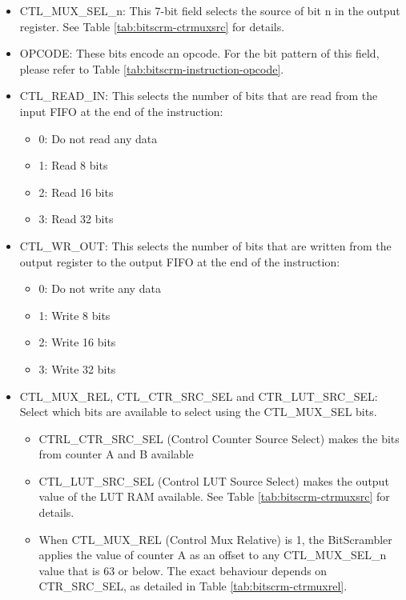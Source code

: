 \documentclass[main\_\_EN.tex]{subfiles}
\begin{document}
\begin{itemize}
\item CTL\_MUX\_SEL\_n: This 7-bit field selects the source of bit n in the output register. See Table \ref{tab:bitscrm-ctrmuxsrc} for details.
\item OPCODE: These bits encode an opcode. For the bit pattern of this field, please refer to Table \ref{tab:bitscrm-instruction-opcode}.
\item CTL\_READ\_IN: This selects the number of bits that are read from the input FIFO at the end of the instruction:

\begin{itemize}
\item 0: Do not read any data
\item 1: Read 8 bits
\item 2: Read 16 bits
\item 3: Read 32 bits
\end{itemize}

\item CTL\_WR\_OUT: This selects the number of bits that are written from the output register to the output FIFO at the end of the instruction:
\begin{itemize}
\item 0: Do not write any data
\item 1: Write 8 bits
\item 2: Write 16 bits
\item 3: Write 32 bits
\end{itemize}


\item CTL\_MUX\_REL, CTL\_CTR\_SRC\_SEL and CTR\_LUT\_SRC\_SEL: Select which bits are available to select using the CTL\_MUX\_SEL bits.
\begin{itemize}
    \item CTRL\_CTR\_SRC\_SEL (Control Counter Source Select) makes the bits from counter A and B available
    \item CTL\_LUT\_SRC\_SEL (Control LUT Source Select) makes the output value of the LUT RAM available. See Table \ref{tab:bitscrm-ctrmuxsrc} for details.
    \item When CTL\_MUX\_REL (Control Mux Relative) is 1, the BitScrambler applies the value of counter A as an offset to any CTL\_MUX\_SEL\_n value that is 63 or below. The exact behaviour depends on CTR\_SRC\_SEL, as detailed in Table \ref{tab:bitscrm-ctrmuxrel}.
\end{itemize}

\end{itemize}
\end{document}
